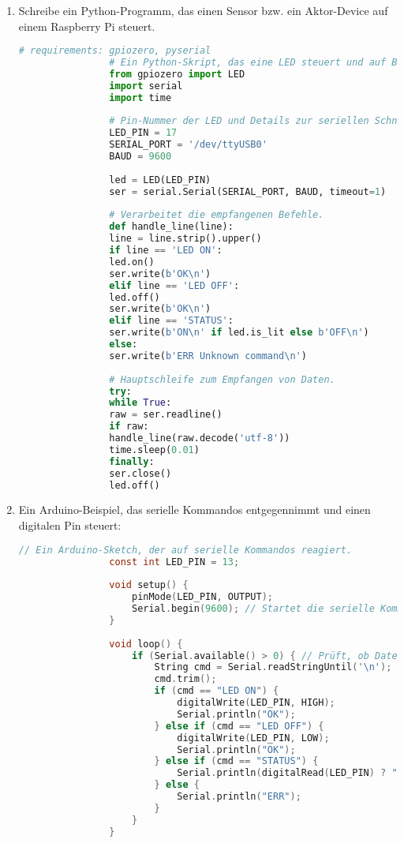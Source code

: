 \documentclass[11pt,a4paper,oneside]{article}
\newcounter{loesung}[section]
\renewcommand{\theloesung}{\thesection.\arabic{loesung}}
\newenvironment{loesung}[1]{%
	\refstepcounter{loesung}%
	\begin{tcolorbox}[termbase,
		colframe=loesungColor!50!black,
		boxed title style={interior style={left color=loesungColor, right color=loesungColor!70!black}},
		title={Lösung~\theloesung: #1}]%
	}{\end{tcolorbox}}
\begin{document}
	\begin{loesung}{Steuerung eines Mikroprozessors mit der seriellen Schnittstelle}
		\begin{enumerate}
			\item Schreibe ein Python-Programm, das einen Sensor bzw. ein Aktor-Device auf einem Raspberry Pi steuert.
			
			\begin{lstlisting}[language=Python, caption={Raspberry Pi: LED-Steuerung + serielle Steuerung (pySerial + gpiozero)}]
				# requirements: gpiozero, pyserial
				# Ein Python-Skript, das eine LED steuert und auf Befehle über die serielle Schnittstelle hört.
				from gpiozero import LED
				import serial
				import time
				
				# Pin-Nummer der LED und Details zur seriellen Schnittstelle.
				LED_PIN = 17
				SERIAL_PORT = '/dev/ttyUSB0'
				BAUD = 9600
				
				led = LED(LED_PIN)
				ser = serial.Serial(SERIAL_PORT, BAUD, timeout=1)
				
				# Verarbeitet die empfangenen Befehle.
				def handle_line(line):
				line = line.strip().upper()
				if line == 'LED ON':
				led.on()
				ser.write(b'OK\n')
				elif line == 'LED OFF':
				led.off()
				ser.write(b'OK\n')
				elif line == 'STATUS':
				ser.write(b'ON\n' if led.is_lit else b'OFF\n')
				else:
				ser.write(b'ERR Unknown command\n')
				
				# Hauptschleife zum Empfangen von Daten.
				try:
				while True:
				raw = ser.readline()
				if raw:
				handle_line(raw.decode('utf-8'))
				time.sleep(0.01)
				finally:
				ser.close()
				led.off()
			\end{lstlisting}

			
			\item Ein Arduino-Beispiel, das serielle Kommandos entgegennimmt und einen digitalen Pin steuert:
			\begin{lstlisting}[language=C, caption={Arduino: Serial command handler}]
				// Ein Arduino-Sketch, der auf serielle Kommandos reagiert.
				const int LED_PIN = 13;
				
				void setup() {
					pinMode(LED_PIN, OUTPUT);
					Serial.begin(9600); // Startet die serielle Kommunikation.
				}
				
				void loop() {
					if (Serial.available() > 0) { // Prüft, ob Daten verfügbar sind.
						String cmd = Serial.readStringUntil('\n'); // Liest eine Zeile.
						cmd.trim();
						if (cmd == "LED ON") {
							digitalWrite(LED_PIN, HIGH);
							Serial.println("OK");
						} else if (cmd == "LED OFF") {
							digitalWrite(LED_PIN, LOW);
							Serial.println("OK");
						} else if (cmd == "STATUS") {
							Serial.println(digitalRead(LED_PIN) ? "ON" : "OFF");
						} else {
							Serial.println("ERR");
						}
					}
				}
			\end{lstlisting}
			

\end{enumerate}
\end{loesung}
\end{document}
